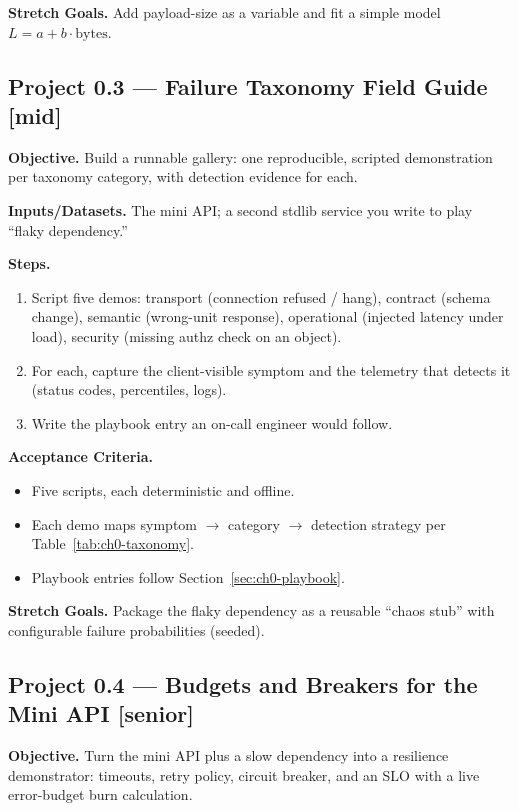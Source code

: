 \textbf{Stretch Goals.} Add payload-size as a variable and fit a simple
model $L = a + b \cdot \text{bytes}$.

\subsection{Project 0.3 --- Failure Taxonomy Field Guide \textnormal{[mid]}}

\textbf{Objective.} Build a runnable gallery: one reproducible, scripted
demonstration per taxonomy category, with detection evidence for each.

\textbf{Inputs/Datasets.} The mini API; a second stdlib service you write to
play ``flaky dependency.''

\textbf{Steps.}
\begin{enumerate}
  \item Script five demos: transport (connection refused / hang), contract
    (schema change), semantic (wrong-unit response), operational (injected
    latency under load), security (missing authz check on an object).
  \item For each, capture the client-visible symptom and the telemetry that
    detects it (status codes, percentiles, logs).
  \item Write the playbook entry an on-call engineer would follow.
\end{enumerate}

\textbf{Acceptance Criteria.}
\begin{itemize}
  \item[$\square$] Five scripts, each deterministic and offline.
  \item[$\square$] Each demo maps symptom $\to$ category $\to$ detection
    strategy per Table~\ref{tab:ch0-taxonomy}.
  \item[$\square$] Playbook entries follow Section~\ref{sec:ch0-playbook}.
\end{itemize}

\textbf{Stretch Goals.} Package the flaky dependency as a reusable
``chaos stub'' with configurable failure probabilities (seeded).

\subsection{Project 0.4 --- Budgets and Breakers for the Mini API
  \textnormal{[senior]}}

\textbf{Objective.} Turn the mini API plus a slow dependency into a
resilience demonstrator: timeouts, retry policy, circuit breaker, and an
SLO with a live error-budget burn calculation.

